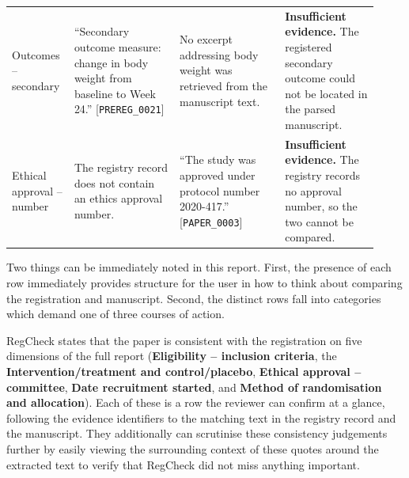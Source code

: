 \documentclass{article}
\begin{document}
\begin{table}[t]
\begin{tabular}{@{}p{0.14\linewidth}p{0.27\linewidth}p{0.27\linewidth}p{0.24\linewidth}@{}}
    \addlinespace[3pt]
    Outcomes -- secondary &
    ``Secondary outcome measure: change in body weight from baseline to Week
    24.'' [\texttt{PREREG\_0021}] &
    No excerpt addressing body weight was retrieved from the manuscript text. &
    \textbf{Insufficient evidence.} The registered secondary outcome could not
    be located in the parsed manuscript. \\
    \addlinespace[3pt]
    Ethical approval -- number &
    The registry record does not contain an ethics approval number. &
    ``The study was approved under protocol number 2020-417.''
    [\texttt{PAPER\_0003}] &
    \textbf{Insufficient evidence.} The registry records no approval number, so
    the two cannot be compared. \\
    \bottomrule
  \end{tabular}
\end{table}

Two things can be immediately noted in this report. First, the presence of each
row immediately provides structure for the user in how to think about comparing
the registration and manuscript. Second, the distinct rows fall into categories
which demand one of three courses of action.

RegCheck states that the paper is consistent with the registration on five
dimensions of the full report (\textbf{Eligibility -- inclusion criteria}, the
\textbf{Intervention/treatment and control/placebo}, \textbf{Ethical approval --
committee}, \textbf{Date recruitment started}, and \textbf{Method of
randomisation and allocation}). Each of these is a row the reviewer can confirm
at a glance, following the evidence identifiers to the matching text in the
registry record and the manuscript. They additionally can scrutinise these
consistency judgements further by easily viewing the surrounding context of
these quotes around the extracted text to verify that RegCheck did not miss
anything important.
\end{document}
